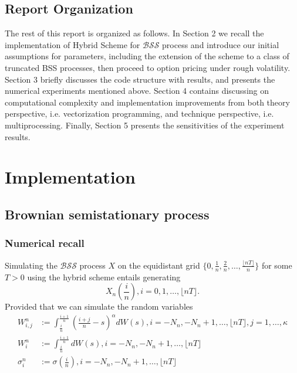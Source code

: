 \documentclass[12pt]{article}
\numberwithin{equation}{section}
\begin{document}
  \subsection{Report Organization}
    
    The rest of this report is organized as follows. In Section 2 we recall the implementation of Hybrid Scheme for $\mathcal{BSS}$ process and introduce our initial assumptions for parameters, including the extension of the scheme to a class of truncated BSS processes, then proceed to option pricing under rough volatility. Section 3 briefly discusses the code structure with results, and presents the numerical experiments mentioned above. Section 4 contains discussing on computational complexity and implementation improvements from both theory perspective, i.e. vectorization programming, and technique perspective, i.e. multiprocessing. Finally, Section 5 presents the sensitivities of the experiment results.

\section{Implementation}
    \subsection{Brownian semistationary process}
      \subsubsection{Numerical recall}
        Simulating the $\mathcal{BSS}$ process $X$ on the equidistant grid $ \{0, \frac{1}{n}, \frac{2}{n}, \dots, \frac{\lfloor nT \rfloor}{n} \} $ for some $T>0$ using the hybrid scheme entails generating
        \begin{equation}
          X_n(\frac{i}{n}), i = 0, 1, \dots, \lfloor nT \rfloor.
        \end{equation}
        Provided that we can simulate the random variables
        \begin{equation}
          \begin{split}
            W_{i,j}^n &:= \int_{\frac{i}{n}}^{\frac{i+1}{n}} (\frac{i+j}{n} - s) ^ \alpha dW(s), i = -N_n, -N_n+1, \dots, \lfloor nT \rfloor, j = 1,\dots,\kappa \\
            W_{i}^n &:= \int_{\frac{i}{n}}^{\frac{i+1}{n}} dW(s), i = -N_n, -N_n+1, \dots, \lfloor nT \rfloor \\
            \sigma_i^n &:= \sigma\left(\frac{i}{n}\right), i = -N_n, -N_n+1, \dots, \lfloor nT \rfloor
          \end{split}
        \end{equation}
\end{document}
